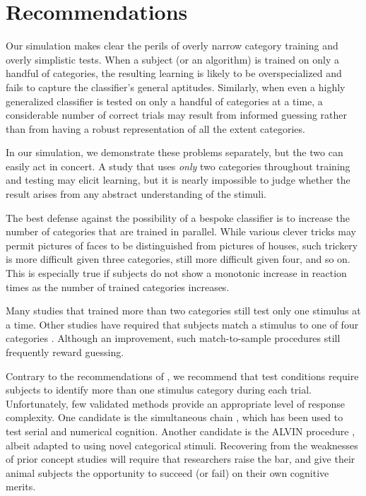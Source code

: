 \documentclass{frontiersSCNS} %
\begin{document}
\section{Recommendations}

Our simulation makes clear the perils of overly narrow category training and overly simplistic tests. When a subject (or an algorithm) is trained on only a handful of categories, the resulting learning is likely to be overspecialized and fails to capture the classifier's general aptitudes. Similarly, when even a highly generalized classifier is tested on only a handful of categories at a time, a considerable number of correct trials may result from informed guessing rather than from having a robust representation of all the extent categories.

In our simulation, we demonstrate these problems separately, but the two can easily act in concert. A study that uses \textsl{only} two categories throughout training and testing may elicit learning, but it is nearly impossible to judge whether the result arises from any abstract understanding of the stimuli. 

The best defense against the possibility of a bespoke classifier is to increase the number of categories that are trained in parallel. While various clever tricks may permit pictures of faces to be distinguished from pictures of houses, such trickery is more difficult given three categories, still more difficult given four, and so on. This is especially true if subjects do not show a monotonic increase in reaction times as the number of trained categories increases.

Many studies that trained more than two categories \citep[e.g.][]{Herr1976, Siga2009, Vonk2013} still test only one stimulus at a time. Other studies have required that subjects match a stimulus to one of four categories \citep{Bhat1988, Laza2004}. Although an improvement, such match-to-sample procedures still frequently reward guessing.

Contrary to the recommendations of \citet{Katz2007}, we recommend that test conditions require subjects to identify more than one stimulus category during each trial. Unfortunately, few validated methods provide an appropriate level of response complexity. One candidate is the simultaneous chain \citep{Terr2005}, which has been used to test serial and numerical cognition. Another candidate is the ALVIN procedure \citep{Wash1995}, albeit adapted to using novel categorical stimuli. Recovering from the weaknesses of prior concept studies will require that researchers raise the bar, and give their animal subjects the opportunity to succeed (or fail) on their own cognitive merits.
\end{document}

